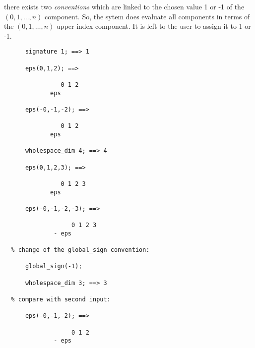there exists
two \emph{conventions} which are linked to the chosen value 1 or -1 of
the $(0,1,\ldots,n)$ component. So, the sytem does evaluate all components
in terms of  the $(0,1,\ldots,n)$ upper index component. It is left to the user
to assign it to 1 or -1.
\begin{verbatim}
      signature 1; ==> 1

      eps(0,1,2); ==>

                0 1 2
             eps

      eps(-0,-1,-2); ==>

                0 1 2
             eps

      wholespace_dim 4; ==> 4

      eps(0,1,2,3); ==>

                0 1 2 3
             eps

      eps(-0,-1,-2,-3); ==>

                   0 1 2 3
              - eps

  % change of the global_sign convention:

      global_sign(-1);

      wholespace_dim 3; ==> 3

  % compare with second input:

      eps(-0,-1,-2); ==>

                   0 1 2
              - eps
\end{verbatim}

